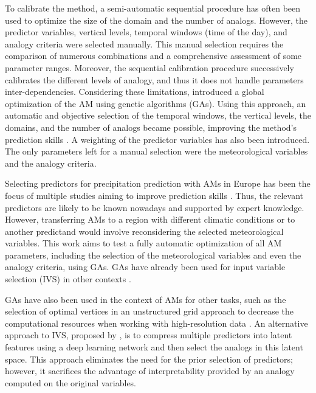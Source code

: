 \documentclass[draft]{agujournal2019}
\begin{document}
To calibrate the method, a semi-automatic sequential procedure \cite{Bontron2004, Radanovics2013, BenDaoud2016} has often been used to optimize the size of the domain and the number of analogs. However, the predictor variables, vertical levels, temporal windows (time of the day), and analogy criteria were selected manually. This manual selection requires the comparison of numerous combinations and a comprehensive assessment of some parameter ranges. Moreover, the sequential calibration procedure successively calibrates the different levels of analogy, and thus it does not handle parameters inter-dependencies. Considering these limitations,  introduced a global optimization of the AM using genetic algorithms (GAs). Using this approach, an automatic and objective selection of the temporal windows, the vertical levels, the domains, and the number of analogs became possible, improving the method's prediction skills \cite{Horton2018a}. A weighting of the predictor variables has also been introduced. The only parameters left for a manual selection were the meteorological variables and the analogy criteria.

Selecting predictors for precipitation prediction with AMs in Europe has been the focus of multiple studies aiming to improve prediction skills \cite{Obled2002, Bontron2004, Gibergans-Baguena2007, Radanovics2013, BenDaoud2016}. Thus, the relevant predictors are likely to be known nowadays and supported by expert knowledge. However, transferring AMs to a region with different climatic conditions or to another predictand would involve reconsidering the selected meteorological variables. This work aims to test a fully automatic optimization of all AM parameters, including the selection of the meteorological variables and even the analogy criteria, using GAs. GAs have already been used for input variable selection (IVS) in other contexts \cite{Dheygere2003, Huang2007, Cateni2010, Gobeyn2017}.

GAs have also been used in the context of AMs for other tasks, such as the selection of optimal vertices in an unstructured grid approach to decrease the computational resources when working with high-resolution data \cite{Hu2019}. An alternative approach to IVS, proposed by , is to compress multiple predictors into latent features using a deep learning network and then select the analogs in this latent space. This approach eliminates the need for the prior selection of predictors; however, it sacrifices the advantage of interpretability provided by an analogy computed on the original variables.
\end{document}
